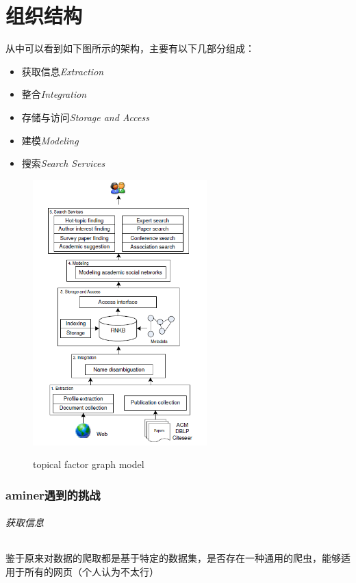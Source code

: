 \documentclass[UTF8]{ctexrep}
\begin{document}
\part{组织结构}

从\cite{tang2008arnetminer}中可以看到如下图所示的架构，主要有以下几部分组成：
\begin{itemize}
    \item {\heiti 获取信息}\textit{Extraction}
    \item {\heiti 整合}\textit{Integration}
    \item {\heiti 存储与访问}\textit{Storage and Access}
    \item {\heiti 建模}\textit{Modeling}
    \item {\heiti 搜索}\textit{Search Services}
\end{itemize}
\begin{figure}[h]
    \caption{topical factor graph model}
    \centering
    \includegraphics[width=0.6\textwidth]{assets/figures/arch.PNG}
    \label{fig:arch}
\end{figure}

\section{aminer遇到的挑战}

\paragraph{获取信息} 鉴于原来对数据的爬取都是基于特定的数据集，是否存在一种通用的爬虫，能够适用于所有的网页（个人认为不太行）
\end{document}
